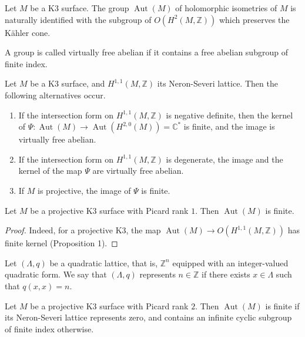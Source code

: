 \begin{theorem}
Let $M$ be a K3 surface. The group
$\operatorname{Aut}(M)$ of holomorphic
isometries of $M$ is naturally identified with
the subgroup of $O(H^2(M,\mathbb{Z}))$ which
preserves the Kähler cone.
\end{theorem}

\begin{definition}
A group is called virtually free abelian if it
contains a free abelian subgroup of finite
index.
\end{definition}

\begin{proposition}[Oguiso]
Let $M$ be a K3 surface, and $H^{1,1}(M,\mathbb{Z})$
its Neron-Severi lattice. Then the following
alternatives occur.
\begin{enumerate}
\item[(a)] If the intersection form on
$H^{1,1}(M,\mathbb{Z})$ is negative definite, then
the kernel of $\Psi: \operatorname{Aut}(M)\to
\operatorname{Aut}(H^{2,0}(M))=\mathbb{C}^*$ is finite,
and the image is virtually free abelian.
\item[(b)] If the intersection form on
$H^{1,1}(M,\mathbb{Z})$ is degenerate, the image and
the kernel of the map $\Psi$ are virtually free
abelian.
\item[(c)] If $M$ is projective, the image of $\Psi$
is finite.
\end{enumerate}
\end{proposition}

\begin{lemma}
Let $M$ be a projective K3 surface with Picard
rank $1$. Then $\operatorname{Aut}(M)$ is finite.
\end{lemma}

\begin{proof}
Indeed, for a projective K3, the map
$\operatorname{Aut}(M)\to O(H^{1,1}(M,\mathbb{Z}))$
has finite kernel (Proposition 1).
\end{proof}

\begin{definition}
Let $(\Lambda,q)$ be a quadratic lattice, that is,
$\mathbb{Z}^n$ equipped with an integer-valued
quadratic form. We say that $(\Lambda,q)$
represents $n\in \mathbb{Z}$ if there exists
$x\in \Lambda$ such that $q(x,x)=n$.
\end{definition}

\begin{lemma}
Let $M$ be a projective K3 surface with Picard
rank $2$. Then $\operatorname{Aut}(M)$ is finite if
its Neron-Severi lattice represents zero, and
contains an infinite cyclic subgroup of finite
index otherwise.
\end{lemma}

